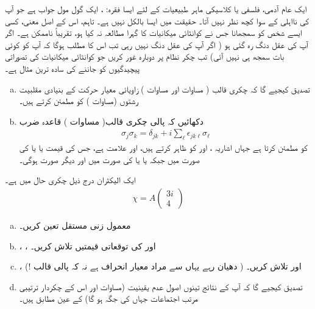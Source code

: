   ایک عام آدمی،  فلسفی  یا   کلاسیکی ماہر طبیعیات کے لئے ایسا فقرہ:  ،   ایک گول مول جواب ہے  جو آپ کی نااہلی کے سوا کچھ نظر نہیں آتا۔ حقیقت میں ایسا بالکل   نہیں ہے۔ تاہم، اس کے  اصل معنی، کسی ایسے شخص کو سمجھانا جس نے کوانٹائی میکانیات کا گہرا  مطالعہ نہ کیا ہو، تقریباً  ناممکن ہے۔ اگر آپ کی عقل  دنگ رہ گئی ہو  (  اگر آپ کی عقل دنگ نہیں رہی تب اس کا مطلب ہوگا کہ آپ کو کوئی بات سمجھ ہی نہیں آئی)   تب     چکر نظام پر  دوبارہ  غور کریں جو  کوانٹائی میکانیات کی   تصوراتی پیچیدگیوں  کو جاننے  کی سادہ ترین مثال ہے۔


\begin{enumerate}[a.]
\item
 تصدیق کیجیے گا کہ چکری  قالب  (  مساوات  اور  مساوات ) زاویائی معیار حرکت کے بنیادی مقلبیت رشتوں (مساوات )   کو مطمئن کرتے ہیں۔ 
\item
 دکھائیں کہ پالی چکری قالب(  مساوات )    قاعدہ ضرب
\begin{align}
\sigma_j\sigma_k = \delta_{jk}+i\sum_{\ell} \epsilon_{jk\ell}\sigma_{\ell}
\end{align}
  کو مطمئن کرتا ہے  جہاں اشاریہ  ،  اور   کو ظاہر کرتے ہیں،  اور    علامت   ہے،    جس کی قیمت   یا   یا   کی صورت میں   جبکہ   یا  یا   کی صورت  میں    اور     دیگر صورت   ہوگی۔ 
  \end{enumerate}
ایک الیکٹران  درج ذیل چکری حال میں ہے۔
\begin{align*}
\chi =A\begin{pmatrix}
3i \\ 4
\end{pmatrix} 
\end{align*}
\begin{enumerate}[a.]
\item
معمول زنی  مستقل   تعین  کریں۔
\item
 ،  ، اور    کی توقعاتی   قیمتیں تلاش کریں۔
\item 
{}   ،         اور     تلاش کریں۔ ( دھیان رہے  یہاں  سے مراد معیار انحراف ہے نہ  کہ   پالی  قالب !)
\item  
  تصدیق کیجیے  گا کہ آپ کے نتائج تینوں اصول عدم  یقینیت (مساوات  اور اس کے  چکردار  ترتیبی  مرتب اجتماعات   جہاں   کی جگہ  ہو گا)  کے عین مطابق ہیں۔
\end{enumerate}
